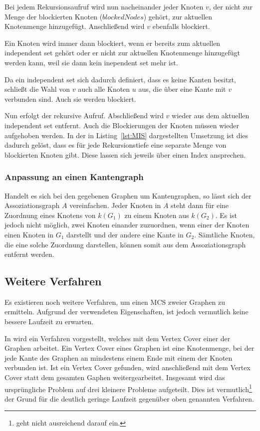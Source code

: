 Bei jedem Rekursionsaufruf wird nun nacheinander jeder Knoten $v$, der nicht zur 
Menge der blockierten Knoten ($blockedNodes$) gehört, zur aktuellen Knotenmenge 
hinzugefügt. Anschließend wird $v$ ebenfalls blockiert.

Ein Knoten wird immer dann 
blockiert, wenn er bereits zum aktuellen independent set gehört oder er nicht 
zur aktuellen Knotenmenge hinzugefügt werden kann, weil sie dann kein inependent 
set mehr ist.

Da ein independent set sich dadurch definiert, dass es keine Kanten 
besitzt, schließt die Wahl von $v$ auch alle Knoten $u$ aus, die über eine Kante 
mit $v$ verbunden sind. Auch sie werden blockiert.

Nun erfolgt der rekursive Aufruf. Abschließend wird $v$ wieder aus 
dem aktuellen independent set entfernt. Auch die Blockierungen der 
Knoten müssen wieder aufgehoben werden. In der in Listing~\ref{lst:MIS} 
dargestellten Umsetzung ist dies dadurch gelöst, dass es für jede 
Rekursionstiefe eine separate Menge von blockierten Knoten gibt. Diese 
lassen sich jeweils über einen Index ansprechen.

\subsubsection{Anpassung an einen Kantengraph}
Handelt es sich bei den gegebenen Graphen um Kantengraphen, so lässt 
sich der Assoziationsgraph $A$ vereinfachen. Jeder Knoten in $A$ 
 steht dann für eine Zuordnung eines Knotens von 
$k(G_1)$ zu einem Knoten aus $k(G_2)$. Es ist jedoch nicht möglich, 
zwei Knoten einander zuzuordnen, wenn einer der Knoten einen Knoten 
in $G_1$ darstellt und der andere eine Kante in $G_2$. Sämtliche Knoten, die 
eine solche Zuordnung darstellen, können somit aus dem Assoziationsgraph 
entfernt werden.

\subsection{Weitere Verfahren}
Es existieren noch weitere Verfahren, um einen MCS zweier Graphen zu ermitteln. 
Aufgrund der verwendeten Eigenschaften, ist jedoch vermutlich keine bessere 
Laufzeit zu erwarten.

In \cite{MCSviaVertexCover} wird ein Verfahren vorgestellt, welches mit 
dem Vertex Cover einer der Graphen arbeitet. Ein Vertex Cover eines Graphen ist 
eine Knotenmenge, bei der jede Kante des Graphen an mindestens einem 
Ende mit einem der Knoten verbunden ist. Ist ein Vertex Cover gefunden, 
wird anschließend mit dem Vertex Cover statt dem gesamten Gaphen 
weitergearbeitet. Insgesamt wird 
das ursprüngliche Problem auf drei kleinere Probleme 
aufgeteilt. Dies ist vermutlich\footnote{\cite{MCSviaVertexCover} geht nicht ausreichend 
darauf ein.} der Grund für die deutlich geringe Laufzeit gegenüber oben genannten 
Verfahren. 

